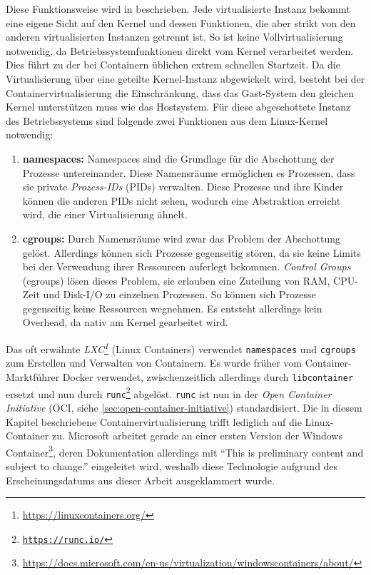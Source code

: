Diese Funktionsweise wird in \autocite{Diedrich2016} beschrieben.
Jede virtualisierte Instanz bekommt eine eigene Sicht auf den Kernel und dessen Funktionen, die aber strikt von den anderen virtualisierten Instanzen getrennt ist.
So ist keine Vollvirtualisierung notwendig, da Betriebssystemfunktionen direkt vom Kernel verarbeitet werden.
Dies führt zu der bei Containern üblichen extrem schnellen Startzeit.
Da die Virtualisierung über eine geteilte Kernel-Instanz abgewickelt wird, besteht bei der Containervirtualisierung die Einschränkung, dass das Gast-System den gleichen Kernel unterstützen muss wie das Hostsystem.
Für diese abgeschottete Instanz des Betriebssystems sind folgende zwei Funktionen aus dem Linux-Kernel notwendig:
\begin{enumerate}
    \item \textbf{namespaces:} Namespaces sind die Grundlage für die Abschottung der Prozesse untereinander. Diese Namensräume ermöglichen es Prozessen, dass sie private \emph{Prozess-IDs} (PIDs) verwalten. Diese Prozesse und ihre Kinder können die anderen PIDs nicht sehen, wodurch eine Abstraktion erreicht wird, die einer Virtualisierung ähnelt.
    \item \textbf{cgroups:} Durch Namensräume wird zwar das Problem der Abschottung gelöst. Allerdings können sich Prozesse gegenseitig stören, da sie keine Limits bei der Verwendung ihrer Ressourcen auferlegt bekommen. \emph{Control Groups} (cgroups) lösen dieses Problem, sie erlauben eine Zuteilung von RAM, CPU-Zeit und Disk-I/O zu einzelnen Prozessen. So können sich Prozesse gegenseitig keine Ressourcen wegnehmen. Es entsteht allerdings kein Overhead, da nativ am Kernel gearbeitet wird.
\end{enumerate}
Das oft erwähnte \emph{LXC\footnote{\url{https://linuxcontainers.org/}}} (Linux Containers) \autocite{rkt-comparison:online} verwendet \texttt{namespaces} und \texttt{cgroups} zum Erstellen und Verwalten von Containern. Es wurde früher vom Container-Marktführer Docker verwendet, zwischenzeitlich allerdings durch \texttt{libcontainer} ersetzt und nun durch \texttt{runc\footnote{\url{https://runc.io/}}} abgelöst.
\texttt{runc} ist nun in der \emph{Open Container Initiative} (OCI, siehe \cref{sec:open-container-initiative}) standardisiert.
Die in diesem Kapitel beschriebene Containervirtualisierung trifft lediglich auf die Linux-Container zu. Microsoft arbeitet gerade an einer ersten Version der Windows Container\footnote{\url{https://docs.microsoft.com/en-us/virtualization/windowscontainers/about/}}, deren Dokumentation allerdings mit "`This is preliminary content and subject to change."' eingeleitet wird, weshalb diese Technologie aufgrund des Erscheinungsdatums aus dieser Arbeit ausgeklammert wurde.

